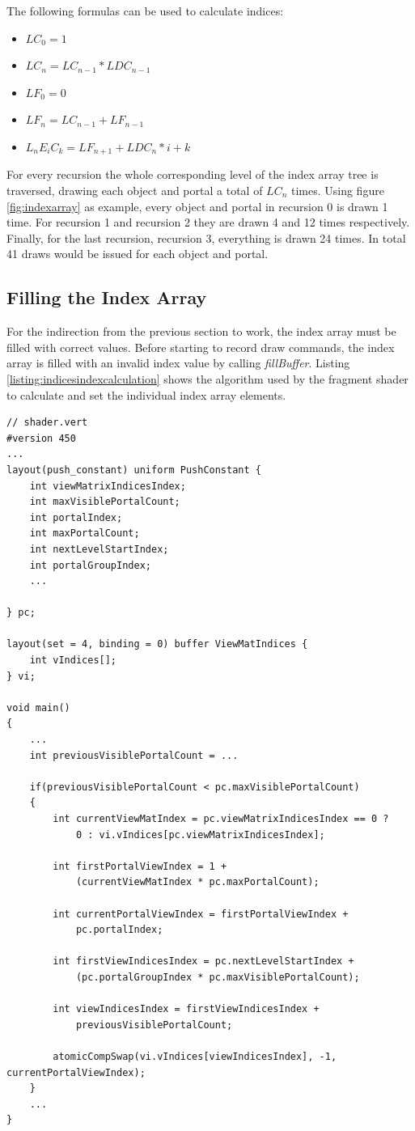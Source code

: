The following formulas can be used to calculate indices:

\begin{itemize}
	\item $LC_0 = 1$
	\item $LC_n = LC_{n-1} * LDC_{n-1}$
	\item $LF_0 = 0$
	\item $LF_n = LC_{n-1} + LF_{n-1}$
	\item $L_nE_iC_k = LF_{n+1} + LDC_{n} * i + k$
\end{itemize}

For every recursion the whole corresponding level of the index array tree is traversed, drawing each object and portal a total of $LC_n$ times. Using figure \ref{fig:indexarray} as example, every object and portal in recursion 0 is drawn 1 time. For recursion 1 and recursion 2 they are drawn 4 and 12 times respectively. Finally, for the last recursion, recursion 3, everything is drawn 24 times. In total 41 draws would be issued for each object and portal.

\subsection{Filling the Index Array}
For the indirection from the previous section to work, the index array must be filled with correct values. Before starting to record draw commands, the index array is filled with an invalid index value by calling \textit{fillBuffer}. Listing \ref{listing:indicesindexcalculation} shows the algorithm used by the fragment shader to calculate and set the individual index array elements.

\begin{lstlisting}[caption={Calculating Indices Index}, label=listing:indicesindexcalculation]
// shader.vert
#version 450
...
layout(push_constant) uniform PushConstant {	
	int viewMatrixIndicesIndex;
	int maxVisiblePortalCount;
	int portalIndex;
	int maxPortalCount;
	int nextLevelStartIndex;
	int portalGroupIndex;
	...

} pc;

layout(set = 4, binding = 0) buffer ViewMatIndices {
	int vIndices[];
} vi;

void main()
{
	...
	int previousVisiblePortalCount = ...
	
	if(previousVisiblePortalCount < pc.maxVisiblePortalCount)
	{
		int currentViewMatIndex = pc.viewMatrixIndicesIndex == 0 ? 
			0 : vi.vIndices[pc.viewMatrixIndicesIndex];
		
		int firstPortalViewIndex = 1 +
			(currentViewMatIndex * pc.maxPortalCount);
		
		int currentPortalViewIndex = firstPortalViewIndex +
			pc.portalIndex;
		
		int firstViewIndicesIndex = pc.nextLevelStartIndex +
			(pc.portalGroupIndex * pc.maxVisiblePortalCount);
			
		int viewIndicesIndex = firstViewIndicesIndex +
			previousVisiblePortalCount;
			
		atomicCompSwap(vi.vIndices[viewIndicesIndex], -1, currentPortalViewIndex);
	}
	...	
}

\end{lstlisting}

